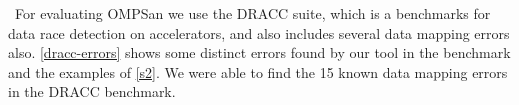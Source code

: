 \
For evaluating OMPSan we use the DRACC\cite{dracc-benchmark} suite, which is a 
benchmarks for data race detection on accelerators, and
also includes several data mapping errors also.
\autoref{dracc-errors} shows some distinct errors found 
by our tool in the benchmark\cite{dracc-benchmark} and the examples of
\autoref{s2}. We were able to find the 15 known 
data mapping errors in the DRACC benchmark. 
